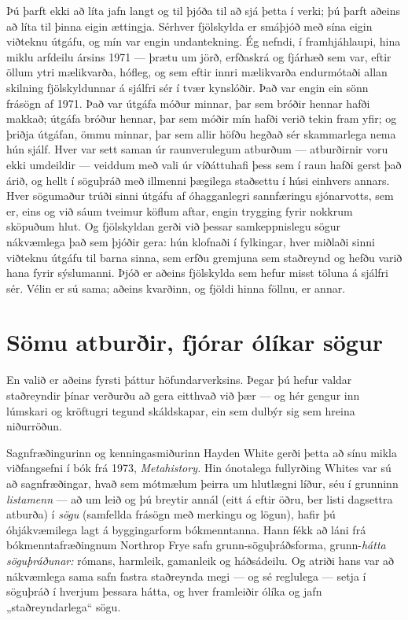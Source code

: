 Þú þarft ekki að líta jafn langt og til þjóða til að sjá þetta í verki; þú þarft aðeins að líta til þinna eigin ættingja. Sérhver fjölskylda er smáþjóð með sína eigin viðteknu útgáfu, og mín var engin undantekning. Ég nefndi, í framhjáhlaupi, hina miklu arfdeilu ársins 1971 — þrætu um jörð, erfðaskrá og fjárhæð sem var, eftir öllum ytri mælikvarða, hófleg, og sem eftir innri mælikvarða endurmótaði allan skilning fjölskyldunnar á sjálfri sér í tvær kynslóðir. Það var engin ein sönn frásögn af 1971. Það var útgáfa móður minnar, þar sem bróðir hennar hafði makkað; útgáfa bróður hennar, þar sem móðir mín hafði verið tekin fram yfir; og þriðja útgáfan, ömmu minnar, þar sem allir höfðu hegðað sér skammarlega nema hún sjálf. Hver var sett saman úr raunverulegum atburðum — atburðirnir voru ekki umdeildir — veiddum með vali úr víðáttuhafi þess sem í raun hafði gerst það árið, og hellt í söguþráð með illmenni þægilega staðsettu í húsi einhvers annars. Hver sögumaður trúði sinni útgáfu af óhagganlegri sannfæringu sjónarvotts, sem er, eins og við sáum tveimur köflum aftar, engin trygging fyrir nokkrum sköpuðum hlut. Og fjölskyldan gerði við þessar samkeppnislegu sögur nákvæmlega það sem þjóðir gera: hún klofnaði í fylkingar, hver miðlaði sinni viðteknu útgáfu til barna sinna, sem erfðu gremjuna sem staðreynd og hefðu varið hana fyrir sýslumanni. Þjóð er aðeins fjölskylda sem hefur misst töluna á sjálfri sér. Vélin er sú sama; aðeins kvarðinn, og fjöldi hinna föllnu, er annar.

\section*{Sömu atburðir, fjórar ólíkar sögur}

En valið er aðeins fyrsti þáttur höfundarverksins. Þegar þú hefur valdar staðreyndir þínar verðurðu að gera eitthvað við þær — og hér gengur inn lúmskari og kröftugri tegund skáldskapar, ein sem dulbýr sig sem hreina niðurröðun.

Sagnfræðingurinn og kenningasmiðurinn Hayden White gerði þetta að sínu mikla viðfangsefni í bók frá 1973, \emph{Metahistory.} Hin ónotalega fullyrðing Whites var sú að sagnfræðingar, hvað sem mótmælum þeirra um hlutlægni líður, séu í grunninn \emph{listamenn} — að um leið og þú breytir annál (eitt á eftir öðru, ber listi dagsettra atburða) í \emph{sögu} (samfellda frásögn með merkingu og lögun), hafir þú óhjákvæmilega lagt á byggingarform bókmenntanna. Hann fékk að láni frá bókmenntafræðingnum Northrop Frye safn grunn-söguþráðsforma, grunn-\emph{hátta söguþráðunar:} rómans, harmleik, gamanleik og háðsádeilu. Og atriði hans var að nákvæmlega sama safn fastra staðreynda megi — og sé reglulega — setja í söguþráð í hverjum þessara hátta, og hver framleiðir ólíka og jafn „staðreyndarlega“ sögu.

